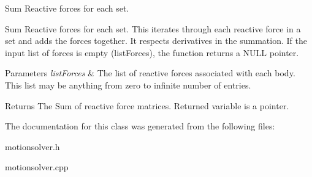 Sum Reactive forces for each set. 

Sum Reactive forces for each set. This iterates through each reactive force in a set and adds the forces together. It respects derivatives in the summation. If the input list of forces is empty (list\-Forces), the function returns a N\-U\-L\-L pointer. 
\begin{DoxyParams}{Parameters}
{\em list\-Forces} & The list of reactive forces associated with each body. This list may be anything from zero to infinite number of entries. \\
\hline
\end{DoxyParams}
\begin{DoxyReturn}{Returns}
The Sum of reactive force matrices. Returned variable is a pointer. 
\end{DoxyReturn}


The documentation for this class was generated from the following files\-:\begin{DoxyCompactItemize}
\item 
motionsolver.\-h\item 
motionsolver.\-cpp\end{DoxyCompactItemize}
